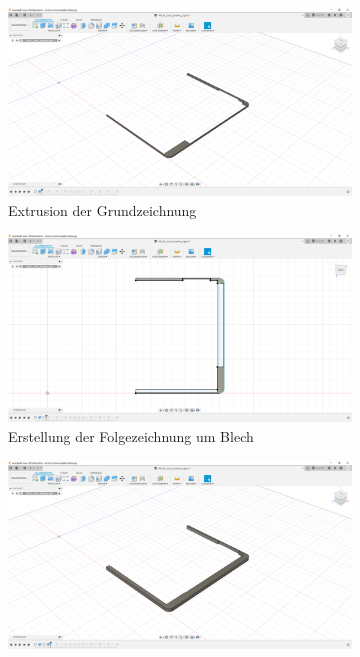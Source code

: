 \begin{figure}[H]
	\begin{subfigure}[t]{.3\linewidth}
		\includegraphics[width=\linewidth]{img/konstruktion_gehaeuse_rechts_001.png}
		\caption[Extrusion der Grundzeichnung]{Extrusion der Grundzeichnung}
		\label{fig:design-right-01}
	\end{subfigure}
	\begin{subfigure}[t]{.3\linewidth}
		\includegraphics[width=\linewidth]{img/konstruktion_gehaeuse_rechts_002.png}
		\caption[Erstellung der Folgezeichnung um Blech]{Erstellung der Folgezeichnung um Blech}
		\label{fig:design-right-02}
	\end{subfigure}
	\begin{subfigure}[t]{.3\linewidth}
		\includegraphics[width=\linewidth]{img/konstruktion_gehaeuse_rechts_003.png}

\end{subfigure}
\end{figure}
